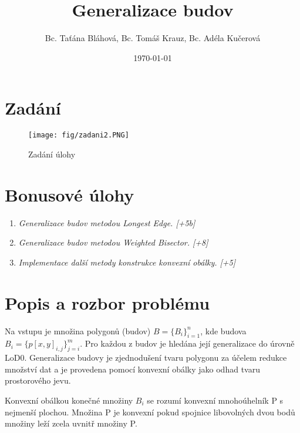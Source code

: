 \documentclass[oneside,12pt,a4paper]{book}
\title{Generalizace budov}
\author{Bc. Taťána Bláhová, Bc. Tomáš Krauz, Bc. Adéla Kučerová}
\date{\today} %
\begin{document}
\maketitle

    \vspace{-2cm}
    \vfill
    \begingroup
    
    \tableofcontents
    \vspace{-0.5cm}
    \printglossary[type=\acronymtype,title=\Large Acronyms]
    \endgroup
    \vspace{-1cm}
% 


\clearpage
\chapter{Zadání}

\begin{figure}[ht!]
    \centering
    \texttt{[image: fig/zadani2.PNG]}
    \caption{Zadání úlohy}
    \label{fig:Zadání úlohy}
\end{figure}



\chapter{Bonusové úlohy} 
\begin{enumerate}
    \item \emph{Generalizace budov metodou Longest Edge.    [+5b]}
    \item \emph{Generalizace budov metodou Weighted Bisector.   [+8]}
    \item \emph{Implementace další metody konstrukce konvexní obálky.   [+5]}
\end{enumerate}


\chapter{Popis a rozbor problému} 
Na vstupu je množina polygonů (budov) $B = \{B_i\}_{i=1}^n$, kde budova $B_i  = \{p[x,y]_{i,j}\}_{j=i}^m$. Pro každou z budov je hledána její generalizace do úrovně LoD0. Generalizace budovy je zjednodušení tvaru polygonu za účelem redukce množství dat a je provedena pomocí konvexní obálky jako odhad tvaru prostorového jevu.\par
Konvexní obálkou konečné množiny ${B_i}$ se rozumí konvexní mnohoúhelník P s nejmenší plochou. Množina P je konvexní pokud spojnice libovolných dvou bodů množiny leží zcela uvnitř množiny P.\par
\end{document}
